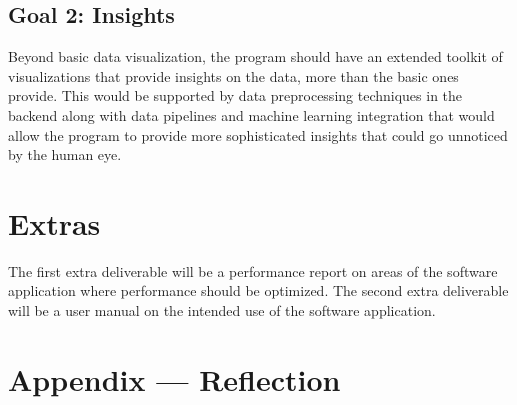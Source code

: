 \documentclass{article}
\begin{document}
 \subsection{Goal 2: Insights} 
 
 \par{Beyond basic data visualization, the program should have an extended toolkit of visualizations that provide insights on the data, more than the basic ones provide. This would be supported by data preprocessing techniques in the backend along with data pipelines and machine learning integration that would allow the program to provide more sophisticated insights that could go unnoticed by the human eye.}

\section{Extras}

\par{The first extra deliverable will be a performance report on areas of the software application where performance should be optimized. 
The second extra deliverable will be a user manual on the intended use of the software application.}



\newpage{}

\section*{Appendix --- Reflection}



\end{document}
